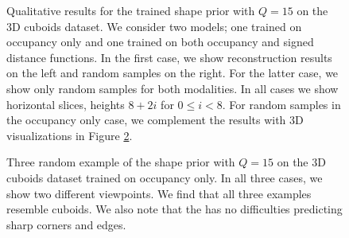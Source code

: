 \begin{figure}
  \caption{Qualitative results for the trained \VAE shape prior with $Q = 15$ on the 3D cuboids dataset.
  We consider two models; one trained on occupancy only and one trained on both occupancy and
  signed distance functions. In the first case, we show reconstruction results on the left and
  random samples on the right. For the latter case, we show only random samples for both modalities.
  In all cases we show horizontal slices, \ie heights $8 + 2i$ for $0 \leq i < 8$. For random samples
  in the occupancy only case, we complement the results with 3D visualizations in Figure
  \ref{fig:experiments-3d-vae-qual-2}.}
  \label{fig:experiments-3d-vae-qual-1}
\end{figure}
\begin{figure}
  \centering
  \vspace{-0.25cm}
  \hspace*{-1cm}
  \caption{Three random example of the \VAE shape prior with $Q = 15$ on the 3D cuboids dataset
  trained on occupancy only. In all three cases, we show two different viewpoints. We find that all
  three examples resemble cuboids. We also note that the \VAE has no difficulties predicting sharp corners
  and edges.}
  \label{fig:experiments-3d-vae-qual-2}
\end{figure}
